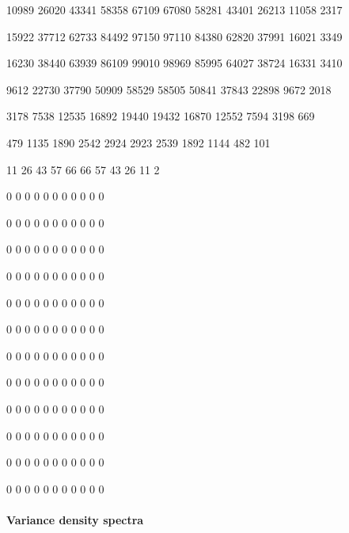 \documentclass{article}
\begin{document}
 10989 26020 43341 58358 67109 67080  58281  43401  26213  11058  2317

 15922 37712 62733 84492 97150 97110  84380  62820  37991  16021  3349

 16230 38440 63939 86109 99010 98969  85995  64027  38724  16331  3410

 9612  22730 37790 50909 58529 58505  50841  37843  22898  9672   2018

  3178  7538  12535 16892 19440 19432  16870  12552  7594   3198   669

  479   1135  1890  2542  2924  2923   2539   1892   1144   482    101

    11    26    43    57    66    66     57     43     26     11     2

    0     0     0     0     0     0      0      0      0      0      0

    0     0     0     0     0     0      0      0      0      0      0

    0     0     0     0     0     0      0      0      0      0      0

    0     0     0     0     0     0      0      0      0      0      0

    0     0     0     0     0     0      0      0      0      0      0

    0     0     0     0     0     0      0      0      0      0      0

    0     0     0     0     0     0      0      0      0      0      0

    0     0     0     0     0     0      0      0      0      0      0

    0     0     0     0     0     0      0      0      0      0      0

    0     0     0     0     0     0      0      0      0      0      0

    0     0     0     0     0     0      0      0      0      0      0

    0     0     0     0     0     0      0      0      0      0      0


\paragraph{ Variance density spectra}
\end{document}
